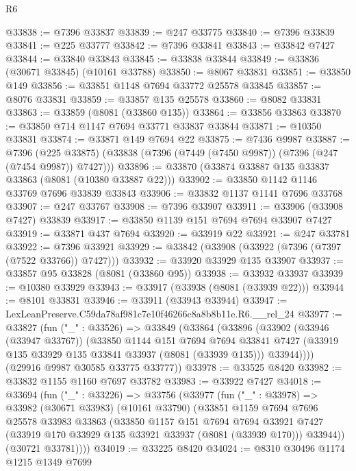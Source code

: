 \begin{lexlean}{R6}
\begin{coremodule}
@33838 := @7396 @33837
@33839 := @247 @33775
@33840 := @7396 @33839
@33841 := @225 @33777
@33842 := @7396 @33841
@33843 := @33842 @7427
@33844 := @33840 @33843
@33845 := @33838 @33844
@33849 := @33836 (@30671 @33845) (@10161 @33788)
@33850 := @8067 @33831
@33851 := @33850 @149
@33856 := @33851 @1148 @7694 @33772 @25578 @33845
@33857 := @8076 @33831
@33859 := @33857 @135 @25578
@33860 := @8082 @33831
@33863 := @33859 (@8081 (@33860 @135))
@33864 := @33856 @33863
@33870 := @33850 @714 @1147 @7694 @33771 @33837 @33844
@33871 := @10350 @33831
@33874 := @33871 @149 @7694 @22
@33875 := @7436 @9987
@33887 := @7396
    (@225 @33875)
    (@33838 (@7396 (@7449 (@7450 @9987)) (@7396 (@247 (@7454 @9987)) @7427)))
@33896 := @33870 (@33874 @33887 @135 @33837 @33863 (@8081 (@10380 @33887 @22)))
@33902 := @33850 @1142 @1146 @33769 @7696 @33839 @33843
@33906 := @33832 @1137 @1141 @7696 @33768
@33907 := @247 @33767
@33908 := @7396 @33907
@33911 := @33906 (@33908 @7427) @33839
@33917 := @33850 @1139 @151 @7694 @7694 @33907 @7427
@33919 := @33871 @437 @7694
@33920 := @33919 @22
@33921 := @247 @33781
@33922 := @7396 @33921
@33929 := @33842 (@33908 (@33922 (@7396 (@7397 (@7522 @33766)) @7427)))
@33932 := @33920 @33929 @135 @33907
@33937 := @33857 @95 @33828 (@8081 (@33860 @95))
@33938 := @33932 @33937
@33939 := @10380 @33929
@33943 := @33917 (@33938 (@8081 (@33939 @22)))
@33944 := @8101 @33831
@33946 := @33911 (@33943 @33944)
@33947 := LexLeanPreserve.C59da78af981c7e10f46266c8a8b8b11e.R6.__rel_24
@33977 := @33827
    (fun ("_" : @33526) =>
    @33849
      (@33864
        (@33896
          (@33902
            (@33946 (@33947 @33767))
            (@33850
              @1144
              @151
              @7694
              @7694
              @33841
              @7427
              (@33919 @135 @33929 @135 @33841 @33937 (@8081 (@33939 @135)))
              @33944))))
      (@29916 @9987 @30585 @33775 @33777))
@33978 := @33525 @8420
@33982 := @33832 @1155 @1160 @7697 @33782
@33983 := @33922 @7427
@34018 := @33694
    (fun ("_" : @33226) =>
    @33756
      (@33977
        (fun ("_" : @33978) =>
        @33982
          (@30671 @33983)
          (@10161 @33790)
          (@33851
            @1159
            @7694
            @7696
            @25578
            @33983
            @33863
            (@33850
              @1157
              @151
              @7694
              @7694
              @33921
              @7427
              (@33919 @170 @33929 @135 @33921 @33937 (@8081 (@33939 @170)))
              @33944))
          (@30721 @33781))))
@34019 := @33225 @8420
@34024 := @8310 @30496 @1174 @1215 @1349 @7699

\end{coremodule}
\end{lexlean}
